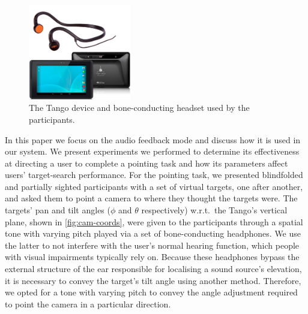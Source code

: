 \documentclass[sigconf, review=true, screen=true, anonymous=true]{acmart}
\begin{document}
\begin{figure}
  \centering
  \includegraphics[width=0.4\textwidth]{figures/tango_headphone.png}
  \caption{The Tango device and bone-conducting headset used by the participants. }\label{fig:tango-headphone}
\end{figure}

In this paper we focus on the audio feedback mode and discuss how it is used in our system.
We present experiments we performed to determine its effectiveness at directing a user to complete a pointing task and how its parameters affect users' target-search performance.
For the pointing task, we presented blindfolded and partially sighted participants with a set of virtual targets, one after another, and asked them to point a camera to where they thought the targets were.
The targets' pan and tilt angles ($\phi$ and $\theta$ respectively) w.r.t.\ the Tango's vertical plane, shown in \cref{fig:cam-coords}, were given to the participants through a spatial tone with varying pitch played via a set of bone-conducting headphones.
We use the latter to not interfere with the user's normal hearing function, which people with visual impairments typically rely on.
Because these headphones bypass the external structure of the ear responsible for localising a sound source's elevation, it is necessary to convey the target's tilt angle using another method.
Therefore, we opted for a tone with varying pitch to convey the angle adjustment required to point the camera in a particular direction.
\end{document}
